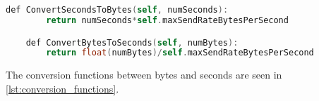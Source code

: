\\\\
\begin{lstlisting}[caption={function for converting seconds to bytes and bytes to seconds}, captionpos=b,language=C,label={lst:conversion_functions}]
    def ConvertSecondsToBytes(self, numSeconds):
        return numSeconds*self.maxSendRateBytesPerSecond

    def ConvertBytesToSeconds(self, numBytes):
        return float(numBytes)/self.maxSendRateBytesPerSecond
\end{lstlisting}
The conversion functions between bytes and seconds are seen in \autoref{lst:conversion_functions}.
